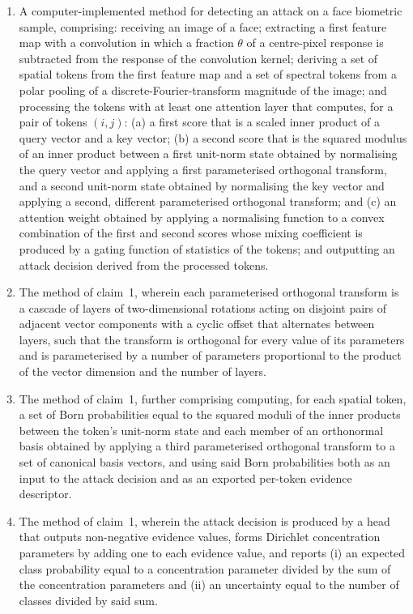 \documentclass[conference]{IEEEtran}
\begin{document}
\begin{enumerate}
\item[\textbf{1.}] A computer-implemented method for detecting an attack on a face
biometric sample, comprising: receiving an image of a face; extracting a first
feature map with a convolution in which a fraction $\theta$ of a centre-pixel
response is subtracted from the response of the convolution kernel; deriving a set
of spatial tokens from the first feature map and a set of spectral tokens from a
polar pooling of a discrete-Fourier-transform magnitude of the image; and
processing the tokens with at least one attention layer that computes, for a pair of
tokens $(i,j)$: (a) a first score that is a scaled inner product of a query vector
and a key vector; (b) a second score that is the squared modulus of an inner
product between a first unit-norm state obtained by normalising the query vector and
applying a first parameterised orthogonal transform, and a second unit-norm state
obtained by normalising the key vector and applying a second, different
parameterised orthogonal transform; and (c) an attention weight obtained by applying
a normalising function to a convex combination of the first and second scores whose
mixing coefficient is produced by a gating function of statistics of the tokens;
and outputting an attack decision derived from the processed tokens.

\item[\textbf{2.}] The method of claim~1, wherein each parameterised orthogonal
transform is a cascade of layers of two-dimensional rotations acting on disjoint
pairs of adjacent vector components with a cyclic offset that alternates between
layers, such that the transform is orthogonal for every value of its parameters and
is parameterised by a number of parameters proportional to the product of the vector
dimension and the number of layers.

\item[\textbf{3.}] The method of claim~1, further comprising computing, for each
spatial token, a set of Born probabilities equal to the squared moduli of the inner
products between the token's unit-norm state and each member of an orthonormal
basis obtained by applying a third parameterised orthogonal transform to a set of
canonical basis vectors, and using said Born probabilities both as an input to the
attack decision and as an exported per-token evidence descriptor.

\item[\textbf{4.}] The method of claim~1, wherein the attack decision is produced by
a head that outputs non-negative evidence values, forms Dirichlet concentration
parameters by adding one to each evidence value, and reports (i) an expected class
probability equal to a concentration parameter divided by the sum of the
concentration parameters and (ii) an uncertainty equal to the number of classes
divided by said sum.


\end{enumerate}
\end{document}
